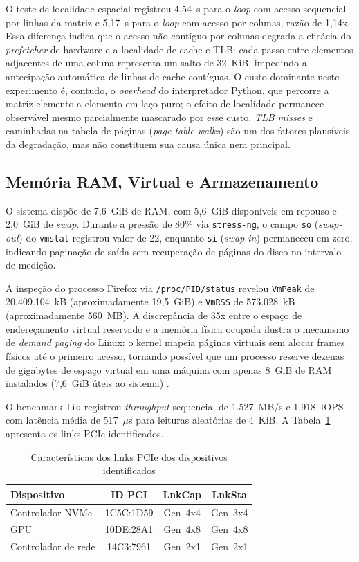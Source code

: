 \documentclass[12pt]{article}
\begin{document}
O teste de localidade espacial registrou 4,54~s para o \textit{loop} com acesso sequencial por linhas da matriz e 5,17~s para o \textit{loop} com acesso por colunas, razão de 1,14x. Essa diferença indica que o acesso não-contíguo por colunas degrada a eficácia do \textit{prefetcher} de hardware e a localidade de cache e TLB: cada passo entre elementos adjacentes de uma coluna representa um salto de 32~KiB, impedindo a antecipação automática de linhas de cache contíguas. O custo dominante neste experimento é, contudo, o \textit{overhead} do interpretador Python, que percorre a matriz elemento a elemento em laço puro; o efeito de localidade permanece observável mesmo parcialmente mascarado por esse custo. \textit{TLB misses} e caminhadas na tabela de páginas (\textit{page table walks}) são um dos fatores plausíveis da degradação, mas não constituem sua causa única nem principal.

\subsection{Memória RAM, Virtual e Armazenamento}

O sistema dispõe de 7,6~GiB de RAM, com 5,6~GiB disponíveis em repouso e 2,0~GiB de \textit{swap}. Durante a pressão de 80\% via \texttt{stress-ng}, o campo \texttt{so} (\textit{swap-out}) do \texttt{vmstat} registrou valor de 22, enquanto \texttt{si} (\textit{swap-in}) permaneceu em zero, indicando paginação de saída sem recuperação de páginas do disco no intervalo de medição.

A inspeção do processo Firefox via \texttt{/proc/PID/status} revelou \texttt{VmPeak} de 20.409.104~kB (aproximadamente 19,5~GiB) e \texttt{VmRSS} de 573.028~kB (aproximadamente 560~MB). A discrepância de 35x entre o espaço de endereçamento virtual reservado e a memória física ocupada ilustra o mecanismo de \textit{demand paging} do Linux: o kernel mapeia páginas virtuais sem alocar frames físicos até o primeiro acesso, tornando possível que um processo reserve dezenas de gigabytes de espaço virtual em uma máquina com apenas 8~GiB de RAM instalados (7,6~GiB úteis ao sistema) \cite{tanenbaum2015}.

O benchmark \texttt{fio} registrou \textit{throughput} sequencial de 1.527~MB/s e 1.918~IOPS com latência média de 517~$\mu$s para leituras aleatórias de 4~KiB. A Tabela~\ref{tab:pcie} apresenta os links PCIe identificados.

\begin{table}[H]
\centering
\caption{Características dos links PCIe dos dispositivos identificados}
\label{tab:pcie}
\begin{tabular}{lccc}
\hline
\textbf{Dispositivo} & \textbf{ID PCI} & \textbf{LnkCap} & \textbf{LnkSta} \\
\hline
Controlador NVMe    & 1C5C:1D59 & Gen~4x4 & Gen~3x4 \\
GPU                 & 10DE:28A1 & Gen~4x8 & Gen~4x8 \\
Controlador de rede & 14C3:7961 & Gen~2x1 & Gen~2x1 \\
\hline
\end{tabular}
\end{table}
\end{document}
